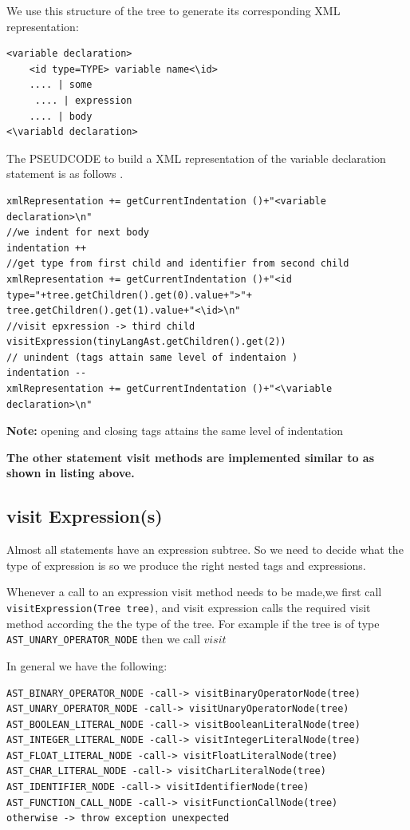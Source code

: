 We use this structure of the tree to generate its corresponding XML representation:
\begin{lstlisting}[caption=XML of variable declaration statement subtree]
<variable declaration>
    <id type=TYPE> variable name<\id>
    .... | some
     .... | expression
    .... | body
<\variabld declaration>
\end{lstlisting}




The PSEUDCODE  to build a XML representation of the variable declaration statement is as follows .
\begin{lstlisting}[caption=PSEUDCODE of \emph{visitVariableDeclarationNode(Tree tree)}]
xmlRepresentation += getCurrentIndentation ()+"<variable declaration>\n"
//we indent for next body 
indentation ++
//get type from first child and identifier from second child
xmlRepresentation += getCurrentIndentation ()+"<id type="+tree.getChildren().get(0).value+">"+ tree.getChildren().get(1).value+"<\id>\n"
//visit epxression -> third child 
visitExpression(tinyLangAst.getChildren().get(2))
// unindent (tags attain same level of indentaion )
indentation --
xmlRepresentation += getCurrentIndentation ()+"<\variable declaration>\n"
\end{lstlisting}


\textbf{Note:} opening and closing tags attains the same level of indentation

\textbf{
	The other statement visit methods are implemented similar to as shown in listing above.
}

\subsection{visit Expression(s)}
\label{sec:visit expression visitor}
Almost all statements have an expression subtree. So we need to decide what the type of expression is so we produce the right nested tags and expressions.

Whenever a call to an expression visit method needs to be made,we first call \verb!visitExpression(Tree tree)!, and visit expression calls the required visit method according the the type of the tree. For example if the tree is of type \verb!AST_UNARY_OPERATOR_NODE! then we call $visit $ 

In general we have the following:
\begin{lstlisting}[caption=PSEUDOCODE for \emph{visitExpression(Tree tree)},label=listing:expression visit]
AST_BINARY_OPERATOR_NODE -call-> visitBinaryOperatorNode(tree)
AST_UNARY_OPERATOR_NODE -call-> visitUnaryOperatorNode(tree)
AST_BOOLEAN_LITERAL_NODE -call-> visitBooleanLiteralNode(tree)
AST_INTEGER_LITERAL_NODE -call-> visitIntegerLiteralNode(tree)
AST_FLOAT_LITERAL_NODE -call-> visitFloatLiteralNode(tree)
AST_CHAR_LITERAL_NODE -call-> visitCharLiteralNode(tree)
AST_IDENTIFIER_NODE -call-> visitIdentifierNode(tree)
AST_FUNCTION_CALL_NODE -call-> visitFunctionCallNode(tree)
otherwise -> throw exception unexpected
\end{lstlisting}

